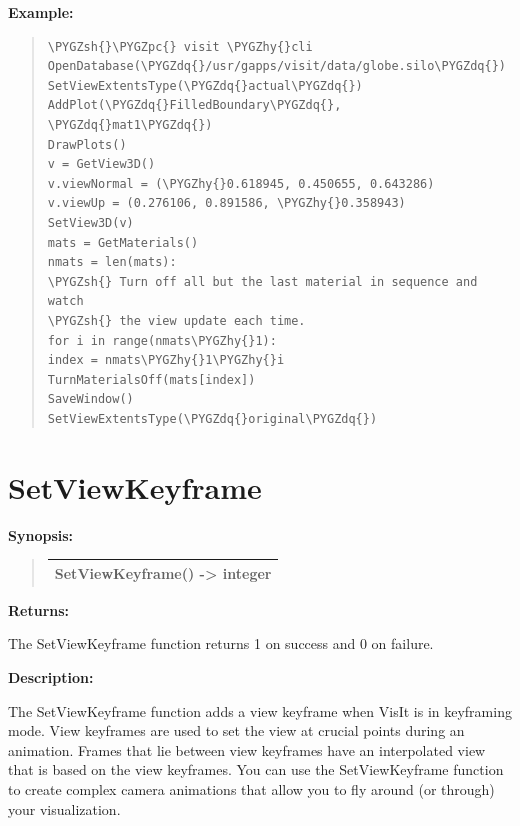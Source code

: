 \documentclass[letterpaper,10pt,english]{sphinxmanual}
\def\PYGZsh{\char`\#}
\def\PYGZpc{\char`\%}
\def\PYGZhy{\char`\-}
\def\PYGZdq{\char`\"}
\begin{document}
\begin{DUlineblock}{0em}
\item[] \textbf{Example:}
\item[] 
\end{DUlineblock}
\begin{quote}

\begin{Verbatim}[commandchars=\\\{\}]
\PYGZsh{}\PYGZpc{} visit \PYGZhy{}cli
OpenDatabase(\PYGZdq{}/usr/gapps/visit/data/globe.silo\PYGZdq{})
SetViewExtentsType(\PYGZdq{}actual\PYGZdq{})
AddPlot(\PYGZdq{}FilledBoundary\PYGZdq{}, \PYGZdq{}mat1\PYGZdq{})
DrawPlots()
v = GetView3D()
v.viewNormal = (\PYGZhy{}0.618945, 0.450655, 0.643286)
v.viewUp = (0.276106, 0.891586, \PYGZhy{}0.358943)
SetView3D(v)
mats = GetMaterials()
nmats = len(mats):
\PYGZsh{} Turn off all but the last material in sequence and watch
\PYGZsh{} the view update each time.
for i in range(nmats\PYGZhy{}1):
index = nmats\PYGZhy{}1\PYGZhy{}i
TurnMaterialsOff(mats[index])
SaveWindow()
SetViewExtentsType(\PYGZdq{}original\PYGZdq{})
\end{Verbatim}
\end{quote}


\section{SetViewKeyframe}
\label{functions:setviewkeyframe}
\begin{DUlineblock}{0em}
\item[] \textbf{Synopsis:}
\end{DUlineblock}
\begin{quote}

\begin{tabulary}{\linewidth}{|L|}
\hline

SetViewKeyframe() -\textgreater{} integer
\\
\hline\end{tabulary}

\end{quote}

\begin{DUlineblock}{0em}
\item[] 
\item[] \textbf{Returns:}
\item[] The SetViewKeyframe function returns 1 on success and 0 on failure.
\item[] 
\item[] \textbf{Description:}
\item[] The SetViewKeyframe function adds a view keyframe when VisIt is in
keyframing mode. View keyframes are used to set the view at crucial points
during an animation. Frames that lie between view keyframes have an
interpolated view that is based on the view keyframes. You can use the
SetViewKeyframe function to create complex camera animations that allow you
to fly around (or through) your visualization.
\end{DUlineblock}
\end{document}
